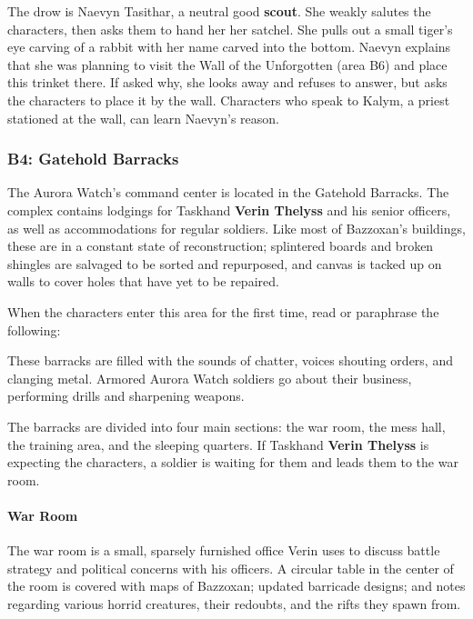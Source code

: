 \documentclass[letterpaper, 11pt, bg=full, twocolumn]{dndbook}
\begin{document}
The drow is Naevyn Tasithar, a neutral good \textbf{scout}. She weakly salutes the characters, then asks them to hand her her satchel. She pulls out a small tiger's eye carving of a rabbit with her name carved into the bottom. Naevyn explains that she was planning to visit the Wall of the Unforgotten (area B6) and place this trinket there. If asked why, she looks away and refuses to answer, but asks the characters to place it by the wall. Characters who speak to Kalym, a priest stationed at the wall, can learn Naevyn's reason.

\subsubsection{B4: Gatehold Barracks}

The Aurora Watch's command center is located in the Gatehold Barracks. The complex contains lodgings for Taskhand \textbf{Verin Thelyss} and his senior officers, as well as accommodations for regular soldiers. Like most of Bazzoxan's buildings, these are in a constant state of reconstruction; splintered boards and broken shingles are salvaged to be sorted and repurposed, and canvas is tacked up on walls to cover holes that have yet to be repaired.

When the characters enter this area for the first time, read or paraphrase the following:

\begin{DndReadAloud}
These barracks are filled with the sounds of chatter, voices shouting orders, and clanging metal. Armored Aurora Watch soldiers go about their business, performing drills and sharpening weapons.
\end{DndReadAloud}

The barracks are divided into four main sections: the war room, the mess hall, the training area, and the sleeping quarters. If Taskhand \textbf{Verin Thelyss} is expecting the characters, a soldier is waiting for them and leads them to the war room.

\paragraph{War Room}

The war room is a small, sparsely furnished office Verin uses to discuss battle strategy and political concerns with his officers. A circular table in the center of the room is covered with maps of Bazzoxan; updated barricade designs; and notes regarding various horrid creatures, their redoubts, and the rifts they spawn from.
\end{document}
